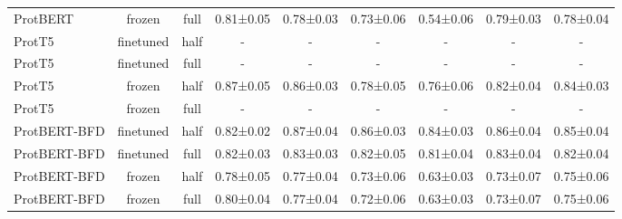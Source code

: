 \begin{tabular}{lcccccccc}
    ProtBERT &         frozen &      full & 0.81±0.05 & 0.78±0.03 & 0.73±0.06 & 0.54±0.06 & 0.79±0.03 & 0.78±0.04 \\
      ProtT5 &      finetuned &      half &         - &         - &         - &         - &         - &         - \\
      ProtT5 &      finetuned &      full &         - &         - &         - &         - &         - &         - \\
      ProtT5 &         frozen &      half & 0.87±0.05 & 0.86±0.03 & 0.78±0.05 & 0.76±0.06 & 0.82±0.04 & 0.84±0.03 \\
      ProtT5 &         frozen &      full &         - &         - &         - &         - &         - &         - \\
ProtBERT-BFD &      finetuned &      half & 0.82±0.02 & 0.87±0.04 & 0.86±0.03 & 0.84±0.03 & 0.86±0.04 & 0.85±0.04 \\
ProtBERT-BFD &      finetuned &      full & 0.82±0.03 & 0.83±0.03 & 0.82±0.05 & 0.81±0.04 & 0.83±0.04 & 0.82±0.04 \\
ProtBERT-BFD &         frozen &      half & 0.78±0.05 & 0.77±0.04 & 0.73±0.06 & 0.63±0.03 & 0.73±0.07 & 0.75±0.06 \\
ProtBERT-BFD &         frozen &      full & 0.80±0.04 & 0.77±0.04 & 0.72±0.06 & 0.63±0.03 & 0.73±0.07 & 0.75±0.06 \\
\bottomrule
\end{tabular}
